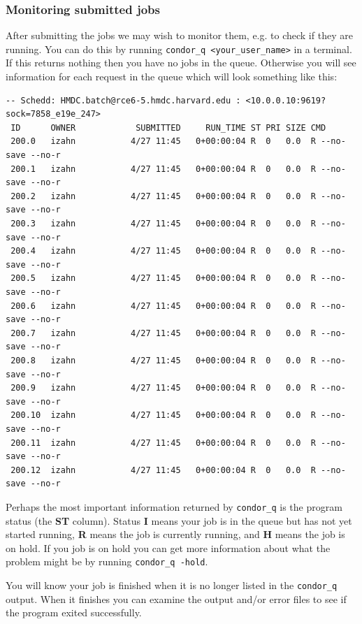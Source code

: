 \documentclass[11pt]{article}
\begin{document}
\subsubsection{Monitoring submitted jobs}
\label{sec-7-3-3}
After submitting the jobs we may wish to monitor them, e.g. to check if they are running. You can do this by running \texttt{condor\_q <your\_user\_name>} in a terminal. If this returns nothing then you have no jobs in the queue. Otherwise you will see information for each request in the queue which will look something like this:
\begin{verbatim}
-- Schedd: HMDC.batch@rce6-5.hmdc.harvard.edu : <10.0.0.10:9619?sock=7858_e19e_247>
 ID      OWNER            SUBMITTED     RUN_TIME ST PRI SIZE CMD               
 200.0   izahn           4/27 11:45   0+00:00:04 R  0   0.0  R --no-save --no-r
 200.1   izahn           4/27 11:45   0+00:00:04 R  0   0.0  R --no-save --no-r
 200.2   izahn           4/27 11:45   0+00:00:04 R  0   0.0  R --no-save --no-r
 200.3   izahn           4/27 11:45   0+00:00:04 R  0   0.0  R --no-save --no-r
 200.4   izahn           4/27 11:45   0+00:00:04 R  0   0.0  R --no-save --no-r
 200.5   izahn           4/27 11:45   0+00:00:04 R  0   0.0  R --no-save --no-r
 200.6   izahn           4/27 11:45   0+00:00:04 R  0   0.0  R --no-save --no-r
 200.7   izahn           4/27 11:45   0+00:00:04 R  0   0.0  R --no-save --no-r
 200.8   izahn           4/27 11:45   0+00:00:04 R  0   0.0  R --no-save --no-r
 200.9   izahn           4/27 11:45   0+00:00:04 R  0   0.0  R --no-save --no-r
 200.10  izahn           4/27 11:45   0+00:00:04 R  0   0.0  R --no-save --no-r
 200.11  izahn           4/27 11:45   0+00:00:04 R  0   0.0  R --no-save --no-r
 200.12  izahn           4/27 11:45   0+00:00:04 R  0   0.0  R --no-save --no-r
\end{verbatim}
Perhaps the most important information returned by \texttt{condor\_q} is the program status (the \textbf{ST} column). Status \textbf{I} means your job is in the queue but has not yet started running, \textbf{R} means the job is currently running, and \textbf{H} means the job is on hold. If you job is on hold you can get more information about what the problem might be by running \texttt{condor\_q -hold}.

You will know your job is finished when it is no longer listed in the \texttt{condor\_q} output. When it finishes you can examine the output and/or error files to see if the program exited successfully.
\end{document}
